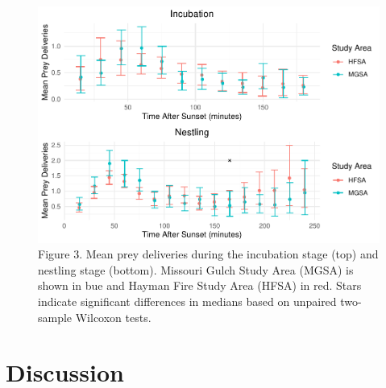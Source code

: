 \documentclass[]{article}
\begin{document}
\begin{figure}
\centering
\includegraphics{../manuscript/figures/plot_site.pdffinal_plot_site-1.pdf}
\caption{Figure 3. Mean prey deliveries during the incubation stage
(top) and nestling stage (bottom). Missouri Gulch Study Area (MGSA) is
shown in bue and Hayman Fire Study Area (HFSA) in red. Stars indicate
significant differences in medians based on unpaired two-sample Wilcoxon
tests.}
\end{figure}

\hypertarget{discussion}{%
\section{Discussion}\label{discussion}}

\renewcommand\refname{References}

\end{document}
